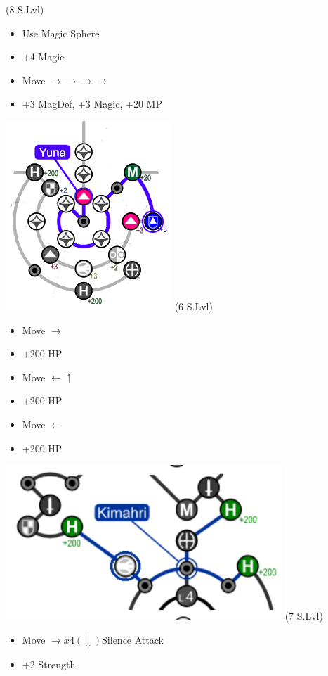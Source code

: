 \begin{spheregrid}
	\begin{itemize}
		\yunaf (8 S.Lvl)
		\begin{itemize}
			\item Use Magic Sphere
			\item +4 Magic
			\item Move $\rightarrow\rightarrow\rightarrow\rightarrow$
			\item +3 MagDef, +3 Magic, +20 MP
		\end{itemize}
		\includegraphics{graphics/Yuna_MRR_1}
		\kimahrif (6 S.Lvl)
		\begin{itemize}
			\item Move $\rightarrow$
			\item +200 HP
			\item Move $\leftarrow\uparrow$
			\item +200 HP
			\item Move $\leftarrow$
			\item +200 HP
		\end{itemize}
		\includegraphics{graphics/kimahrimmr}
		\wakkaf (7 S.Lvl)
		\begin{itemize}
			\item Move $\rightarrow x4 (\downarrow)$Silence Attack
			\item +2 Strength

\end{itemize}
\end{itemize}
\end{spheregrid}
